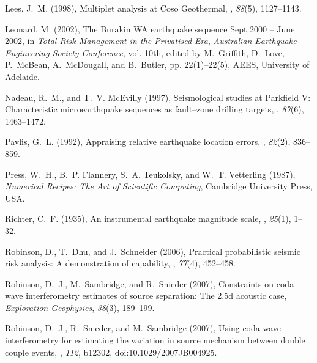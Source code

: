 \documentclass[12pt,double]{article}
\begin{document}
\begin{thebibliography}{45}
Lees, J.~M. (1998), Multiplet analysis at {C}oso {G}eothermal, \bssa, \textit{88}(5), 1127--1143.

Leonard, M. (2002), The {B}urakin {WA} earthquake sequence {S}ept 2000 --
  {J}une 2002, in \textit{Total Risk Management in the Privatised Era},
  \textit{Australian Earthquake Engineering Society Conference}, vol. 10th,
  edited by M.~Griffith, D.~Love, P.~Mc{B}ean, A.~Mc{D}ougall, and B.~Butler,
  pp. 22(1)--22(5), AEES, University of Adelaide.

Nadeau, R.~M., and T.~V. Mc{E}villy (1997), Seismological studies at
  {P}arkfield {V}: {C}haracteristic microearthquake sequences as fault--zone
  drilling targets, \bssa,
  \textit{87}(6), 1463--1472.

Pavlis, G.~L. (1992), Appraising relative earthquake location errors,
  \bssa, \textit{82}(2),
  836--859.

Press, W.~H., B.~P. Flannery, S.~A. Teukolsky, and W.~T. Vetterling (1987),
  \textit{Numerical Recipes: The Art of Scientific Computing}, Cambridge
  University Press, USA.

Richter, C.~F. (1935), An instrumental earthquake magnitude scale,
  \bssa, \textit{25}(1),
  1--32.

Robinson, D., T.~Dhu, and J.~Schneider (2006), Practical probabilistic seismic
  risk analysis: {A} demonstration of capability, \srl, \textit{77}(4), 452--458.

Robinson, D.~J., M.~Sambridge, and R.~Snieder (2007{}), Constraints
  on coda wave interferometry estimates of source separation: The 2.5d acoustic
  case, \textit{Exploration Geophysics}, \textit{38}(3), 189--199.

Robinson, D.~J., R.~Snieder, and M.~Sambridge (2007{}), Using coda
  wave interferometry for estimating the variation in source mechanism between
  double couple events, \jgr, \textit{112},
  b12302, doi:10.1029/2007JB004925.


\end{thebibliography}
\end{document}
